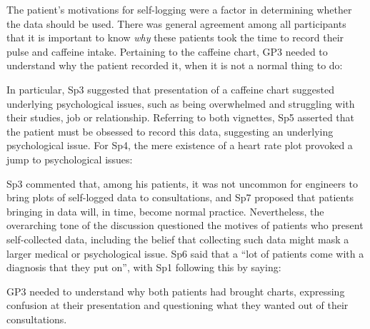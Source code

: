 \documentclass{sigchi}
\begin{document}
The patient's motivations for self-logging were a factor in determining whether the data should be used. There was general agreement among all participants that it is important to know \emph{why} these patients took the time to record their pulse and caffeine intake. Pertaining to the caffeine chart, GP3 needed to understand why the patient recorded it, when it is not a normal thing to do:


In particular, Sp3 suggested that presentation of a caffeine chart suggested underlying psychological issues, such as being overwhelmed and struggling with their studies, job or relationship. Referring to both vignettes, Sp5 asserted that the patient must be obsessed to record this data, suggesting an underlying psychological issue. For Sp4, the mere existence of a heart rate plot provoked a jump to psychological issues:


Sp3 commented that, among his patients, it was not uncommon for engineers to bring plots of self-logged data to consultations, and Sp7 proposed that patients bringing in data will, in time, become normal practice. Nevertheless, the overarching tone of the discussion questioned the motives of patients who present self-collected data, including the belief that collecting such data might mask a larger medical or psychological issue. Sp6 said that a ``lot of patients come with a diagnosis that they put on'', with Sp1 following this by saying:


GP3 needed to understand why both patients had brought charts, expressing confusion at their presentation and questioning what they wanted out of their consultations.

\end{document}
